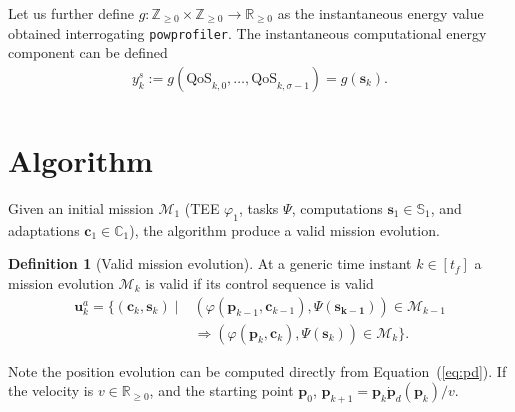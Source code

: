 \documentclass[letterpaper,10pt,conference]{ieeeconf}
\newcommand{\stt}[1]{{\small\tt #1}} %
\newcommand{\powprof}{\stt{powprofiler}}
\theoremstyle{definition}
\newtheorem{defn}{Definition}[section]
\begin{document}
Let us further define $g:\mathbb{Z}_{\geq 0}\times\mathbb{Z}_{\geq 0}\rightarrow\mathbb{R}_{\geq 0}$ as the instantaneous energy value obtained interrogating \powprof{}. The instantaneous computational energy component can be defined
\begin{equation}\label{eq:energy-comp}\begin{split}
  y_k^s:=g\left(\text{QoS}_{k,0},\dots,\text{QoS}_{k,\sigma-1}\right)=g\left(\mathbf{s}_{k}\right).\\
\end{split}\end{equation}


\section{Algorithm}
\label{sec:algo}


Given an initial mission $\mathcal{M}_1$ (TEE $\varphi_1$, tasks $\Psi$, computations $\mathbf{s}_1\in\mathbb{S}_1$, and adaptations $\mathbf{c}_1\in\mathbb{C}_1$), the algorithm produce a valid mission evolution.

\begin{defn}[Valid mission evolution]\label{def:valid}
  At a generic time instant $k\in[t_f]$ a mission evolution $\mathcal{M}_{k}$ is valid if its control sequence is valid
  \begin{equation}\begin{split}
    \mathbf{u}^a_{k}=\{(\mathbf{c}_{k},\mathbf{s}_{k})\mid&(\varphi(\mathbf{p}_{k-1},\mathbf{c}_{k-1}),\Psi(\mathbf{s_{k-1}}))\in\mathcal{M}_{k-1}\\
    &\Longrightarrow(\varphi(\mathbf{p}_{k},\mathbf{c}_{k}),\Psi(\mathbf{s}_{k}))\in\mathcal{M}_{k}\}.
  \end{split}\end{equation}
\end{defn}

Note the position evolution can be computed directly from Equation~(\ref{eq:pd}). If the velocity is $v\in\mathbb{R}_{\geq 0}$, and the starting point $\mathbf{p}_0$, $\mathbf{p}_{k+1}=\mathbf{p}_k\dot{\mathbf{p}}_d(\mathbf{p}_k)/v$.
\end{document}
